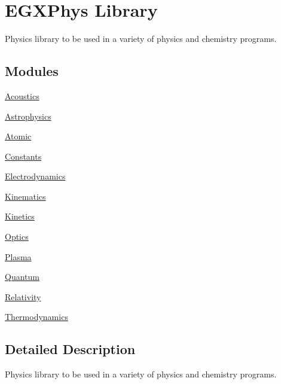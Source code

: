 \hypertarget{group___e_g_x_phys}{}\section{E\+G\+X\+Phys Library}
\label{group___e_g_x_phys}


Physics library to be used in a variety of physics and chemistry programs.  


\subsection*{Modules}
\begin{DoxyCompactItemize}
\item 
\mbox{\hyperlink{group___e_g_x_phys-_acoustics}{Acoustics}}
\item 
\mbox{\hyperlink{group___e_g_x_phys-_astrophysics}{Astrophysics}}
\item 
\mbox{\hyperlink{group___e_g_x_phys-_atomic}{Atomic}}
\item 
\mbox{\hyperlink{group___e_g_x_phys-_constants}{Constants}}
\item 
\mbox{\hyperlink{group___e_g_x_phys-_electrodynamics}{Electrodynamics}}
\item 
\mbox{\hyperlink{group___kinematics}{Kinematics}}
\item 
\mbox{\hyperlink{group___e_g_x_phys-_kinetics}{Kinetics}}
\item 
\mbox{\hyperlink{group___e_g_x_phys-_optics}{Optics}}
\item 
\mbox{\hyperlink{group___e_g_x_phys-_plasma}{Plasma}}
\item 
\mbox{\hyperlink{group___e_g_x_phys-_quantum}{Quantum}}
\item 
\mbox{\hyperlink{group___e_g_x_phys-_relativity}{Relativity}}
\item 
\mbox{\hyperlink{group___e_g_x_phys-_thermodynamics}{Thermodynamics}}
\end{DoxyCompactItemize}


\subsection{Detailed Description}
Physics library to be used in a variety of physics and chemistry programs. 

